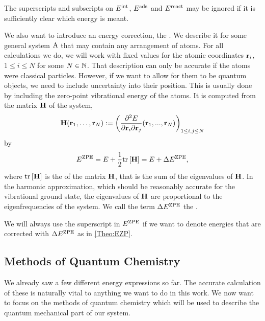 \documentclass[8.5pt,twoside,twocolumn]{article}
\newcommand\zpe{\enmat{\te{ZPE}}}
\newcommand\eint{\enmat{E^{\te{int}}}}
\newcommand\eads{\enmat{E^{\te{ads}}}}
\newcommand\ere{\enmat{E^{\te{react}}}}
\newcommand\ezp{\enmat{E^{\zpe}}}
\renewcommand\H{\enmat{\bo H}}
\renewcommand\r{\bo r}
\theoremstyle{standard}
\begin{document}
The superscripts and subscripts on $\eint$, $\eads$ and $\ere$ may be ignored if it is sufficiently
clear which energy is meant.

We also want to introduce an energy correction, the .
We describe it for some general system $\text A$ that may contain any arrangement of atoms.
For all calculations we do, we will work with fixed values for the atomic coordinates
$\r_i$, $1 \le i \le N$ for some $N \in \mathbb{N}$. That description can only be accurate if
the atoms were classical particles. However, if we want to allow for them to be
quantum objects, we need to include uncertainty into their position. This is usually
done by including the zero-point vibrational energy of the atoms. It is computed from the
 matrix $\H$ of the system,
\begin{equation}
 \H(\r_1,\ldots,\r_N) := \rb{\deri {^2 E} {\r_i \del \r_j} (\r_1,...,\r_N) }_{1\le i,j \le N}
 \label{Theo:Hessian}
\end{equation}
by
\begin{equation}
 \ezp=E + \frac 1 2 \te {tr} \ed{\H} = E + \Dl \ezp,
 \label{Theo:EZP}
\end{equation}
where $\te {tr} \ed{\H}$ is the  of the matrix $\H$, that is the sum of the eigenvalues
of $\H$. In the harmonic approximation, which should be reasonably accurate for
the vibrational ground state, the eigenvalues of $\H$ are 
proportional to the eigenfrequencies of the system. We call the term $\Dl \ezp$
the .

We will always use the superscript in $\ezp$ if we want to denote energies that are corrected 
with $\Dl \ezp$ as in \eqref{Theo:EZP}.

\subsection{Methods of Quantum Chemistry}
\label{Sec:Theo:QMMet}

We already saw a few different energy expressions so far. The accurate
calculation of these is naturally vital to anything we want to do in this work.
We now want to focus on the methods of quantum chemistry which will be used to
describe the quantum mechanical part of our system.
\end{document}
